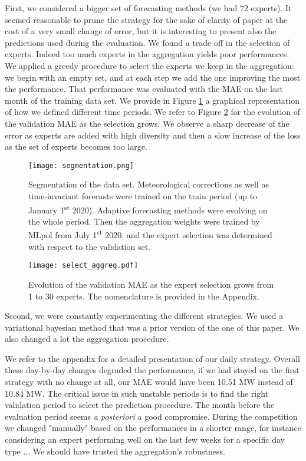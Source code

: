 \documentclass[transmag]{IEEEtran}
\begin{document}
First, we considered a bigger set of forecasting methods (we had $72$ experts). It seemed reasonable to prune the strategy for the sake of clarity of paper at the cost of a very small change of error, but it is interesting to present also the predictions used during the evaluation. We found a trade-off in the selection of experts. Indeed too much experts in the aggregation yields poor performances. We applied a greedy procedure to select the experts we keep in the aggregation: we begin with an empty set, and at each step we add the one improving the most the performance. That performance was evaluated with the MAE on the last month of the training data set. We provide in Figure \ref{fig:segmentation} a graphical representation of how we defined different time periods. We refer to Figure \ref{fig:greedy_selection} for the evolution of the validation MAE as the selection grows. We observe a sharp decrease of the error as experts are added with high diversity and then a slow increase of the loss as the set of experts becomes too large.
\begin{figure}
    \centering
    \texttt{[image: segmentation.png]}
    \caption{Segmentation of the data set. Meteorological corrections as well as time-invariant forecasts were trained on the train period (up to January 1\textsuperscript{st} 2020). Adaptive forecasting methods were evolving on the whole period. Then the aggregation weights were trained by MLpol from July 1\textsuperscript{st} 2020, and the expert selection was determined with respect to the validation set.}
    \label{fig:segmentation}
\end{figure}
\begin{figure}
    \centering
    \texttt{[image: select\_aggreg.pdf]}
    \caption{Evolution of the validation MAE as the expert selection grows from 1 to 30 experts. The nomenclature is provided in the Appendix.}
    \label{fig:greedy_selection}
\end{figure}

Second, we were constantly experimenting the different strategies. We used a variational bayesian method that was a prior version of the one of this paper. We also changed a lot the aggregation procedure.

We refer to the appendix for a detailed presentation of our daily strategy. Overall these day-by-day changes degraded the performance, if we had stayed on the first strategy with no change at all, our MAE would have been 10.51 MW instead of 10.84 MW. The critical issue in such unstable periods is to find the right validation period to select the prediction procedure. The month before the evaluation period seems {\it a posteriori} a good compromise. During the competition we changed "manually" based on the performances in a shorter range, for instance considering an expert performing well on the last few weeks for a specific day type ... We should have trusted the aggregation's robustness.
\end{document}

